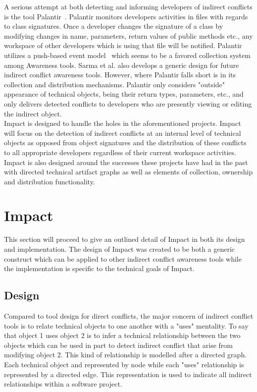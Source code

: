 \documentclass[conference]{IEEEtran}
\begin{document}
A serious attempt at both detecting and informing developers of
indirect conflicts is the tool Palantir~\cite{Sarma:2007:TSA}. Palantir
monitors developers activities in files with regards to class signatures.
Once a developer changes the signature of a class by modifying changes
in name, parameters, return values of public methods etc., any workspace
of other developers which is using that file will be notified. Palantir utilizes
a push-based event model~\cite{Fitzpatrick:2002:SPA} which seems to be
a favored collection system among Awareness tools. Sarma et al. also
develops a generic design for future indirect conflict awareness tools. 
However, where Palantir falls short is in its collection and distribution
mechanisms. Palantir only considers "outside" appearance of technical
objects, being their return types, parameters, etc., and only delivers
detected conflicts to developers who are presently viewing or editing
the indirect object.\\

Impact is designed to handle the holes in the aforementioned projects.
Impact will focus on the detection of indirect conflicts at an internal level
of technical objects as opposed from object signatures and the distribution
of these conflicts to all appropriate developers regardless of their current
workspace activities. Impact is also designed around the successes these
projects have had in the past with directed technical artifact graphs as 
well as elements of collection, ownership and distribution functionality.\\


\section{Impact}
This section will proceed to give an outlined detail of Impact in both its
design and implementation. The design of Impact was created to be both
a generic construct which can be applied to other indirect conflict 
awareness tools while the implementation is specific to the technical
goals of Impact.

\subsection{Design}
Compared to tool design for direct conflicts, the major concern of 
indirect conflict tools is to relate technical objects to one another
with a "uses" mentality. To say that object 1 uses object 2 is to infer
a technical relationship between the two objects which can be used
in part to detect indirect conflict that arise from modifying object
2. This kind of relationship is modelled after a directed graph. Each
technical object and represented by node while each "uses"
relationship is represented by a directed edge. This representation
is used to indicate all indirect relationships within a software project.\\
\end{document}
